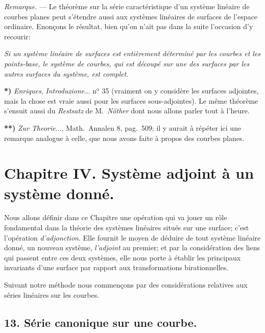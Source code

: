 \documentclass{article}
\begin{document}
\emph{Remarque.} --- Le théorème sur la série caractéristique d'un système linéaire de courbes planes peut s'étendre aussi aux systèmes linéaires de surfaces de l'espace ordinaire. Enonçons le résultat, bien qu'on n'ait pas dans la suite l'occasion d'y recourir:

\emph{Si un système linéaire de surfaces est entièrement déterminé par les courbes et les points-base, le système de courbes, qui est découpé sur une des surfaces par les autres surfaces du système, est complet.}

\textbf{*)} \emph{Enriques}, \emph{Introduzione}... n${}^{\text{o}}$ 35 (vraiment on y considère les surfaces adjointes, mais la chose est vraie aussi pour les surfaces sous-adjointes). Le même théorème s'ensuit aussi du \emph{Restsatz} de M.\ \emph{Nöther} dont nous allons parler tout à l'heure.

\textbf{**)} \emph{Zur Theorie}..., Math.\ Annalen 8, pag.\ 509; il y aurait à répéter ici une remarque analogue à celle, que nous avons faite à propos des courbes planes.


\section*{Chapitre IV. Système adjoint à un système donné.}

Nous allons définir dans ce Chapitre une opération qui va jouer un rôle fondamental dans la théorie des systèmes linéaires situés sur une surface; c'est l'opération \emph{d'adjonction}. Elle fournit le moyen de déduire de tout système linéaire donné, un nouveau système, \emph{l'adjoint} au premier; et par la considération des liens qui passent entre ces deux systèmes, elle nous porte à établir les principaux invariants d'une surface par rapport aux transformations birationnelles.

Suivant notre méthode nous commençons par des considérations relatives aux séries linéaires sur les courbes.

\subsection*{13. Série canonique sur une courbe.}
\end{document}
